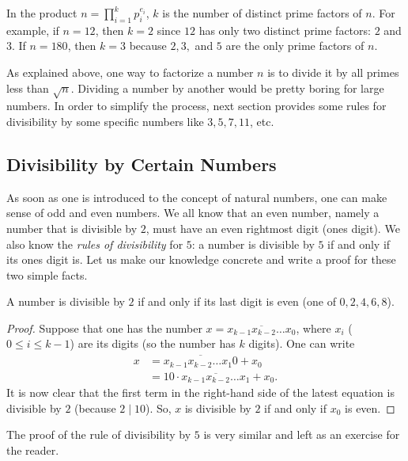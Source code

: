 \documentclass{subfile}
\begin{document}
	\begin{note}
		In the product $n=\prod\limits_{i=1}^{k}p_i^{e_i}$, $k$ is the number of distinct prime factors of $n$. For example, if $n=12$, then $k=2$ since $12$ has only two distinct prime factors: $2$ and $3$. If $n=180$, then $k=3$ because $2,3,$ and $5$ are the only prime factors of $n$.
	\end{note}

	As explained above, one way to factorize a number $n$ is to divide it by all primes less than $\sqrt n$. Dividing a number by another would be pretty boring for large numbers. In order to simplify the process, next section provides some rules for divisibility by some specific numbers like $3, 5, 7, 11$, etc.

\subsection{Divisibility by Certain Numbers}\label{subs:divrules}

As soon as one is introduced to the concept of natural numbers, one can make sense of odd and even numbers. We all know that an even number, namely a number that is divisible by $2$, must have an even rightmost digit (ones digit). We also know the \textit{rules of divisibility} for $5$: a number is divisible by $5$ if and only if its ones digit is. Let us make our knowledge concrete and write a proof for these two simple facts.

	\begin{proposition}[Divisibility by $2$]
		A number is divisible by $2$ if and only if its last digit is even (one of $0,2,4,6,8$).
	\end{proposition}

	\begin{proof}
		Suppose that one has the number $x = \overline{x_{k-1}x_{k-2} \ldots x_0}$, where $x_i$ ($0 \leq i \leq k-1$) are its digits (so the number has $k$ digits). One can write
			\begin{align*}
				x &= \overline{x_{k-1} x_{k-2} \ldots x_1 0} + x_0\\
				  &= 10 \cdot \overline{x_{k-1} x_{k-2} \ldots x_1} + x_0.
			\end{align*}
		It is now clear that the first term in the right-hand side of the latest equation is divisible by $2$ (because $2 \mid 10$). So, $x$ is divisible by $2$ if and only if $x_0$ is even.
	\end{proof}

The proof of the rule of divisibility by $5$ is very similar and left as an exercise for the reader.
\end{document}

